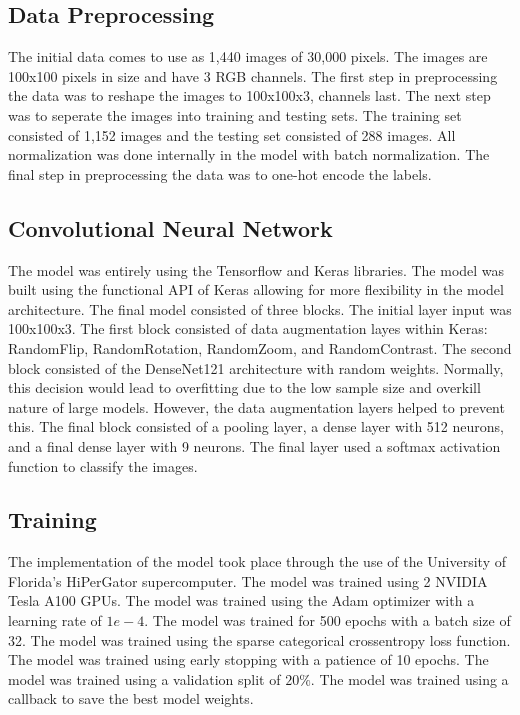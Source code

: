 \documentclass[conference]{IEEEtran}
\begin{document}
\subsection{Data Preprocessing}
The initial data comes to use as 1,440 images of 30,000 pixels. The images are 100x100 pixels in size and have 3 RGB channels. The first step in preprocessing the data was to reshape the images to 100x100x3, channels last. The next step was to seperate the images into training and testing sets. The training set consisted of 1,152 images and the testing set consisted of 288 images. All normalization was done internally in the model with batch normalization. The final step in preprocessing the data was to one-hot encode the labels.

\subsection{Convolutional Neural Network}
The model was entirely using the Tensorflow and Keras libraries. The model was built using the functional API of Keras allowing for more flexibility in the model architecture. The final model consisted of three blocks. The initial layer input was 100x100x3. The first block consisted of data augmentation layes within Keras: RandomFlip, RandomRotation, RandomZoom, and RandomContrast. The second block consisted of the DenseNet121 architecture with random weights. Normally, this decision would lead to overfitting due to the low sample size and overkill nature of large models. However, the data augmentation layers helped to prevent this. The final block consisted of a pooling layer, a dense layer with 512 neurons, and a final dense layer with 9 neurons. The final layer used a softmax activation function to classify the images.

\subsection{Training}
The implementation of the model took place through the use of the University of Florida's HiPerGator supercomputer. The model was trained using 2 NVIDIA Tesla A100 GPUs. The model was trained using the Adam optimizer with a learning rate of $1e-4$. The model was trained for 500 epochs with a batch size of 32. The model was trained using the sparse categorical crossentropy loss function. The model was trained using early stopping with a patience of 10 epochs. The model was trained using a validation split of $20\%$. The model was trained using a callback to save the best model weights.
\end{document}
